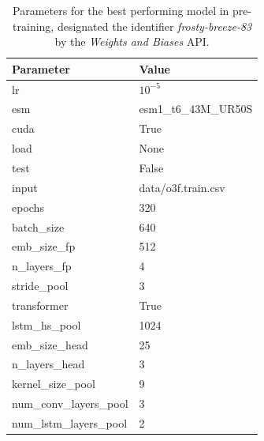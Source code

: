 \documentclass[16pt]{book}
\begin{document}
\begin{table}
	\caption{\label{frostybreezeparams} Parameters for the best performing model in pre-training, designated the identifier \textit{frosty-breeze-83} by the \textit{Weights and Biases} API.}
	\begin{center}
	\begin{tabular}{ll}
		\textbf{Parameter} &     \textbf{Value} \\
		\hline
		lr                   &             $10^{-5}$ \\
		esm                  &   esm1\_t6\_43M\_UR50S \\
		cuda                 &                True \\
		load                 &                None \\
		test                 &               False \\
		input                &  data/o3f.train.csv \\
		epochs               &                320 \\
		batch\_size           &                640 \\
		emb\_size\_fp          &               512 \\
		n\_layers\_fp          &                 4 \\
		stride\_pool          &                 3 \\
		transformer          &                True \\
		lstm\_hs\_pool         &              1024 \\
		emb\_size\_head        &              25 \\
		n\_layers\_head        &                 3 \\
		kernel\_size\_pool     &                 9 \\
		num\_conv\_layers\_pool &                 3 \\
		num\_lstm\_layers\_pool &                 2 \\
	\end{tabular}
	\end{center}
\end{table}
\end{document}
